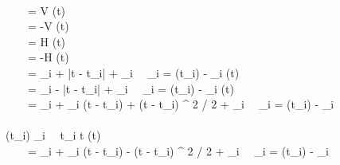 \begin{figure}[p]
\begin{center}
\begin{sllisting}
\pbinference\\
  \hspace{0.5em}\text{--}\hspace{0.4em}\Init \, \land \, \Inv \, \land \, \cavintmax = V \limply \cavint(t) \le \cavintmax\\
  \hspace{0.5em}\text{--}\hspace{0.4em}\Init \, \land \, \Inv \, \land \, \cavintmin = -V \limply \cavint(t) \ge \cavintmin\\
  \hspace{0.5em}\text{--}\hspace{0.4em}\Init \, \land \, \Inv \, \land \, \cahintmax = H \limply \cahint(t) \le \cahintmax\\
  \hspace{0.5em}\text{--}\hspace{0.4em}\Init \, \land \, \Inv \, \land \, \cahintmin = -H \limply \cahint(t) \ge \cahintmin\\
  \hspace{0.5em}\text{--}\hspace{0.4em}\Init \, \land \, \Inv \, \land \, \cavintmax = {\caOmegaOne}_i + \caAint |t - t_i| + {\caEtaOne}_i \, \land \, {\caOmegaOne}_i = \cavint(t_i) - {\caEtaOne}_i \limply \cavint(t) \le \cavintmax\\
  \hspace{0.5em}\text{--}\hspace{0.4em}\Init \, \land \, \Inv \, \land \, \cavintmin = {\caOmegaOne}_i - \caAint |t - t_i| + {\caEtaOne}_i \, \land \, {\caOmegaOne}_i = \cavint(t_i) - {\caEtaOne}_i \limply \cavint(t) \ge \cavintmin\\
  \hspace{0.5em}\text{--}\hspace{0.4em}\Init \, \land \, \Inv \, \land \, \cahintmax = {\caOmegaTwo}_i + {\cavintmax}_i (t - t_i) + \caAint (t - t_i) ^ 2 / 2 + {\caEtaTwo}_i \, \land \, {\caOmegaTwo}_i = \cahint(t_i) - {\caEtaTwo}_i \, \land \, \\
  \slind \cavint(t_i) \le {\cavintmax}_i \, \land \, t_i \le t \limply \cahint(t) \le \cahintmax\\
  \hspace{0.5em}\text{--}\hspace{0.4em}\Init \, \land \, \Inv \, \land \, \cahintmin = {\caOmegaTwo}_i + {\cavintmin}_i (t - t_i) - \caAint (t - t_i) ^ 2 / 2 + {\caEtaTwo}_i \, \land \, {\caOmegaTwo}_i = \cahint(t_i) - {\caEtaTwo}_i \, \land \, \\

\end{sllisting}
\end{center}
\end{figure}
